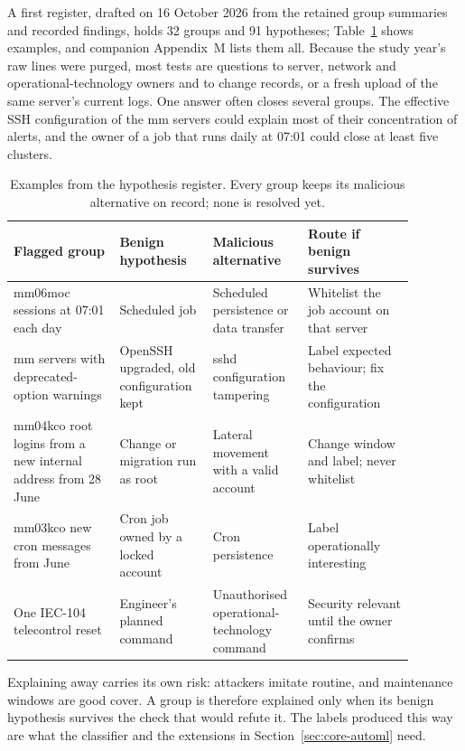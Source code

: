 \documentclass[11pt,a4paper]{article}
\newcommand{\tok}[1]{\texttt{\detokenize{#1}}}
\begin{document}
A first register, drafted on 16 October 2026 from the retained group summaries and recorded findings, holds 32 groups and 91 hypotheses; Table~\ref{tab:core-hypotheses} shows examples, and companion Appendix~M lists them all. Because the study year's raw lines were purged, most tests are questions to server, network and operational-technology owners and to change records, or a fresh upload of the same server's current logs. One answer often closes several groups. The effective SSH configuration of the mm servers could explain most of their concentration of alerts, and the owner of a job that runs daily at 07:01 could close at least five clusters.

\begin{table}[H]
\centering\small
\begin{tabular}{p{0.24\linewidth}p{0.2\linewidth}p{0.2\linewidth}p{0.24\linewidth}}
\toprule
\textbf{Flagged group} & \textbf{Benign hypothesis} & \textbf{Malicious alternative} & \textbf{Route if benign survives} \\
\midrule
mm06moc sessions at 07:01 each day & Scheduled job & Scheduled persistence or data transfer & Whitelist the job account on that server \\
mm servers with deprecated-option warnings & OpenSSH upgraded, old configuration kept & sshd configuration tampering & Label expected behaviour; fix the configuration \\
mm04kco root logins from a new internal address from 28 June & Change or migration run as root & Lateral movement with a valid account & Change window and label; never whitelist \tok{root} \\
mm03kco new cron messages from June & Cron job owned by a locked account & Cron persistence & Label operationally interesting \\
One IEC-104 telecontrol reset & Engineer's planned command & Unauthorised operational-technology command & Security relevant until the owner confirms \\
\bottomrule
\end{tabular}
\caption{Examples from the hypothesis register. Every group keeps its malicious alternative on record; none is resolved yet.}
\label{tab:core-hypotheses}
\end{table}

Explaining away carries its own risk: attackers imitate routine, and maintenance windows are good cover. A group is therefore explained only when its benign hypothesis survives the check that would refute it. The labels produced this way are what the classifier and the extensions in Section~\ref{sec:core-automl} need.
\end{document}
